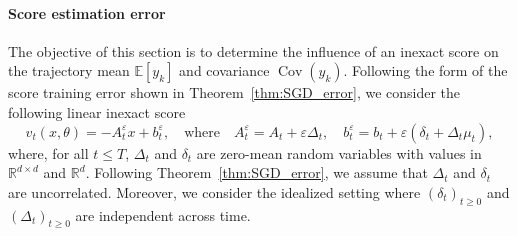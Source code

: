 \documentclass[11pt]{article}
\newcommand{\id}{\operatorname{Id}}
\newcommand{\RR}{\mathbb{R}}
\newcommand{\EE}{\mathbb{E}}
\newcommand{\cov}{\operatorname{Cov}}
\begin{document}
\vspace{-0.2cm}
\paragraph{Score estimation error}
The objective of this section is to determine the influence of 
an inexact score on the trajectory mean $\EE[y_k]$ 
and covariance $\cov(y_k)$. Following the form of the score training  error shown in Theorem~\ref{thm:SGD_error}, we consider the following linear inexact score
\begin{equation} \label{eq:diff_inexact_score}
    v_{t}(x, \theta) = - A_{t}^\varepsilon x + b_{t}^\varepsilon, \quad \text{where}\quad 
    A_{t}^\varepsilon = A_{t} + \varepsilon \Delta_{t}, \quad b_{t}^\varepsilon = b_{t} + \varepsilon (\delta_{t} + \Delta_{t} \mu_{t}),
\end{equation}
where, for all $t \leq T$, \(\Delta_{t}\) and \(\delta_{t}\) are zero-mean random variables with values in $\RR^{d \times d}$ and $\RR^{d}$. Following Theorem~\ref{thm:SGD_error}, we assume that \(\Delta_{t}\) and \(\delta_{t}\) are uncorrelated. Moreover, we consider the idealized setting where $(\delta_t)_{t \geq 0}$ and $ (\Delta_t)_{t \geq 0}$ are  independent across time.  
\end{document}
